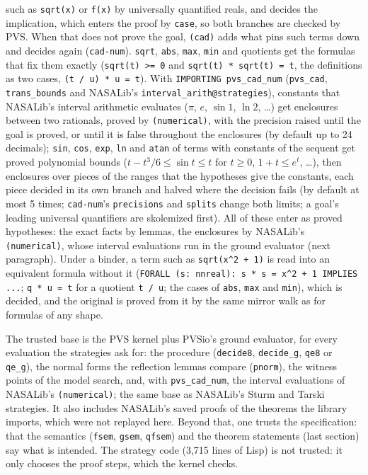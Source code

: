 \documentclass[11pt]{article}
\begin{document}
such as \texttt{sqrt(x)} or \texttt{f(x)} by universally quantified reals, and decides the implication, which enters
the proof by \texttt{case}, so both branches are checked by PVS.
When that does not prove the goal, \texttt{(cad)} adds what pins such terms down and decides again
(\texttt{cad-num}). \texttt{sqrt}, \texttt{abs}, \texttt{max}, \texttt{min} and quotients get the formulas that fix
them exactly (\texttt{sqrt(t) >= 0} and \texttt{sqrt(t) * sqrt(t) = t}, the definitions as two cases,
\texttt{(t / u) * u = t}). With \texttt{IMPORTING pvs\_cad\_num} (\texttt{pvs\_cad}, \texttt{trans\_bounds} and NASALib's
\texttt{interval\_arith@strategies}), constants that NASALib's interval
arithmetic evaluates ($\pi$, $e$, $\sin 1$, $\ln 2$, \ldots) get enclosures between two rationals, proved by
\texttt{(numerical)}, with the precision raised until the goal is proved, or until it is false throughout the
enclosures (by default up to 24 decimals); \texttt{sin}, \texttt{cos}, \texttt{exp}, \texttt{ln} and \texttt{atan} of terms with constants of the
sequent get proved polynomial bounds ($t - t^3/6 \le \sin t \le t$ for $t \ge 0$, $1 + t \le e^t$, \ldots), then
enclosures over pieces of the ranges that the hypotheses give the constants, each piece decided in its own
branch and halved where the decision fails (by default at most 5 times; \texttt{cad-num}'s \texttt{precisions} and
\texttt{splits} change both limits; a goal's leading universal quantifiers are skolemized first). All of these enter
as proved hypotheses: the exact facts by lemmas, the enclosures by NASALib's \texttt{(numerical)}, whose interval
evaluations run in the ground evaluator (next paragraph). Under a binder, a term such as
\texttt{sqrt(x\textasciicircum 2 + 1)} is read into an equivalent formula without it
(\texttt{FORALL (s: nnreal): s * s = x\textasciicircum 2 + 1 IMPLIES ...}; \texttt{q * u = t} for a quotient
\texttt{t / u}; the cases of \texttt{abs}, \texttt{max} and \texttt{min}), which is decided, and the original is proved from it by the same mirror walk as for formulas of any
shape.

The trusted base is the PVS kernel plus PVSio's ground evaluator, for every evaluation the strategies ask for: the
procedure (\texttt{decide8}, \texttt{decide\_g}, \texttt{qe8} or \texttt{qe\_g}), the normal forms the reflection lemmas compare (\texttt{pnorm}), the
witness points of the model search, and, with \texttt{pvs\_cad\_num}, the interval evaluations of NASALib's
\texttt{(numerical)}; the same base as NASALib's Sturm and Tarski strategies. It also includes NASALib's saved proofs of the
theorems the library imports, which were not replayed here. Beyond that, one trusts the specification: that the
semantics (\texttt{fsem}, \texttt{gsem}, \texttt{qfsem}) and the theorem statements (last section) say what is intended.
The strategy code (3,715 lines of Lisp) is not trusted: it only chooses the proof steps, which the kernel checks.
\end{document}
